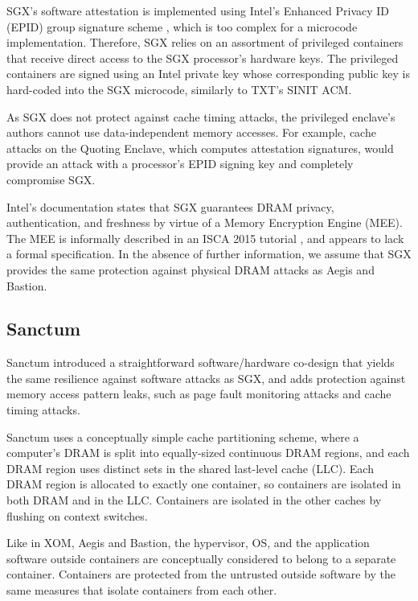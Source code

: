 SGX's software attestation is implemented using Intel's Enhanced Privacy ID
(EPID) group signature scheme \cite{brickell2009epid}, which is too complex for
a microcode implementation. Therefore, SGX relies on an assortment of
privileged containers that receive direct access to the SGX processor's
hardware keys. The privileged containers are signed using an Intel private key
whose corresponding public key is hard-coded into the SGX microcode, similarly
to TXT's SINIT ACM.

As SGX does not protect against cache timing attacks, the privileged enclave's
authors cannot use data-independent memory accesses. For example, cache attacks
on the Quoting Enclave, which computes attestation signatures, would provide
an attack with a processor's EPID signing key and completely compromise SGX.

Intel's documentation states that SGX guarantees DRAM privacy, authentication,
and freshness by virtue of a Memory Encryption Engine (MEE). The MEE is
informally described in an ISCA 2015 tutorial \cite{intel2015iscasgx}, and
appears to lack a formal specification. In the absence of further information,
we assume that SGX provides the same protection against physical DRAM attacks
as Aegis and Bastion.


\subsection{Sanctum}

Sanctum \cite{costan2015sanctum} introduced a straightforward software/hardware
co-design that yields the same resilience against software attacks as SGX, and
adds protection against memory access pattern leaks, such as page fault
monitoring attacks and cache timing attacks.

Sanctum uses a conceptually simple cache partitioning scheme, where a
computer's DRAM is split into equally-sized continuous DRAM regions, and each
DRAM region uses distinct sets in the shared last-level cache (LLC). Each DRAM
region is allocated to exactly one container, so containers are isolated in
both DRAM and in the LLC. Containers are isolated in the other caches by
flushing on context switches.

Like in XOM, Aegis and Bastion, the hypervisor, OS, and the application
software outside containers are conceptually considered to belong to a separate
container. Containers are protected from the untrusted outside software by the
same measures that isolate containers from each other.

